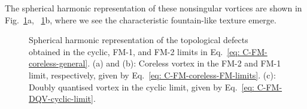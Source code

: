 The spherical harmonic representation of these nonsingular vortices are shown
in Fig.~\ref{fig: C-FM-coreless-initial-states}a,
~\ref{fig: C-FM-coreless-initial-states}b, where we see the characteristic
fountain-like texture emerge.
\begin{figure}
    \centering
    \caption[Spherical harmonic representation of a nonsingular vortex connection
        across a cyclic to ferromagnetic interface]
    {\label{fig: C-FM-coreless-initial-states}Spherical harmonic
        representation of the topological defects obtained in the cyclic, FM-1,
        and FM-2 limits in Eq.~\eqref{eq: C-FM-coreless-general}.
        (a) and (b): Coreless vortex in the FM-2 and FM-1 limit, respectively,
        given by Eq.~\eqref{eq: C-FM-coreless-FM-limits}.
        (c): Doubly quantised vortex in the cyclic limit, given by
        Eq.~\eqref{eq: C-FM-DQV-cyclic-limit}.}
\end{figure}

